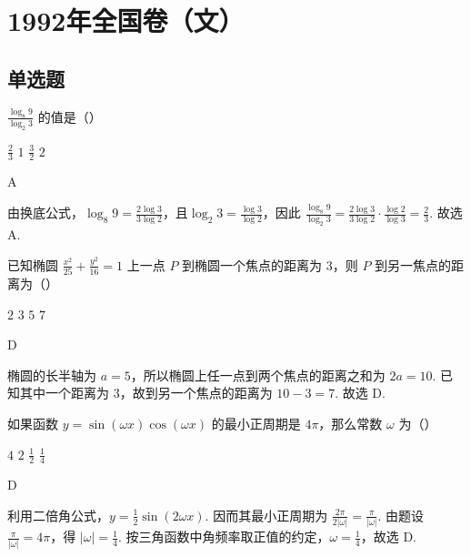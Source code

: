 \chapter{1992年全国卷（文）}
\section{单选题}

\begin{problem}
\(\frac{\log_8 9}{\log_2 3}\) 的值是（\quad）

\choices
    {\(\frac{2}{3} \)}
    {\(1\)}
    {\(\frac{3}{2} \)}
    {\(2\)}

\begin{answer}
A
\end{answer}

\begin{solution}
由换底公式，\(\log_8 9=\frac{2\log 3}{3\log 2}\)，且\(\log_2 3=\frac{\log 3}{\log 2}\)，因此
\(\frac{\log_8 9}{\log_2 3}=\frac{2\log 3}{3\log 2}\cdot\frac{\log 2}{\log 3}=\frac{2}{3}\). 故选 A.
\end{solution}
\end{problem}

\begin{problem}
已知椭圆 \(\frac{x^2}{25} + \frac{y^2}{16} = 1\) 上一点 \(P\) 到椭圆一个焦点的距离为 \(3\)，则 \(P\) 到另一焦点的距离为（\quad）

\choices
    {\(2\)}
    {\(3\)}
    {\(5\)}
    {\(7\)}

\begin{answer}
D
\end{answer}

\begin{solution}
椭圆的长半轴为 \(a=5\)，所以椭圆上任一点到两个焦点的距离之和为 \(2a=10\). 已知其中一个距离为 \(3\)，故到另一个焦点的距离为 \(10-3=7\). 故选 D.
\end{solution}
\end{problem}

\begin{problem}
如果函数 \(y=\sin(\omega x)\cos(\omega x)\) 的最小正周期是 \(4\pi\)，那么常数 \(\omega\) 为（\quad）

\choices
    {\(4\)}
    {\(2\)}
    {\(\frac{1}{2} \)}
    {\(\frac{1}{4} \)}

\begin{answer}
D
\end{answer}

\begin{solution}
利用二倍角公式，\(y=\frac{1}{2}\sin(2\omega x)\). 因而其最小正周期为 \(\frac{2\pi}{2|\omega|}=\frac{\pi}{|\omega|}\). 由题设 \(\frac{\pi}{|\omega|}=4\pi\)，得 \(|\omega|=\frac{1}{4}\). 按三角函数中角频率取正值的约定，\(\omega=\frac{1}{4}\)，故选 D.
\end{solution}
\end{problem}

